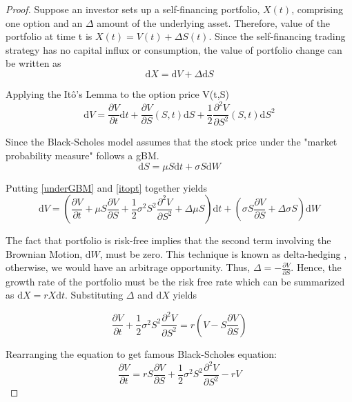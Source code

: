 \documentclass[12pt, oneside]{book}
\theoremstyle{plain}
\theoremstyle{definition}
\begin{document}
\begin{proof}
Suppose an investor sets up a self-financing portfolio,  $ X(t)$, comprising one option and an $\Delta$ amount of the underlying asset. Therefore, value of the portfolio at time t is $X(t) = V(t) + \Delta S(t)$. 
Since the self-financing trading strategy has no capital influx or consumption, the value of portfolio change can be written as 
\begin{equation}
\mathrm{d} X = \mathrm{d} V + \Delta \mathrm{d}S
\end{equation}

Applying the It\^{o}'s Lemma to the option price V(t,S)
\begin{equation}\label{itopt}
\mathrm{d}V = \frac{\partial V}{\partial t} \mathrm{d}t + \frac{\partial V}{\partial S} (S,t) \mathrm{d}S + \frac{1}{2}\frac{\partial^2 V}{\partial S^2}(S,t) \mathrm{d}S^2
\end{equation}

Since the Black-Scholes model assumes that the stock price under the "market probability measure" follows a gBM. 
\begin{equation}\label{underGBM}
\mathrm{d}S = \mu S \mathrm{d}t + \sigma S \mathrm{d}W
\end{equation}

Putting \ref{underGBM} and \ref{itopt} together yields
\begin{equation}
\mathrm{d}V = (\frac{\partial V}{\partial t} + \mu S \frac{\partial V}{\partial S} + \frac{1}{2} \sigma^2 S^2 \frac{\partial^2 V}{\partial S^2} + \Delta \mu S) \mathrm{d}t + (\sigma S \frac{\partial V}{\partial S}+\Delta \sigma S) \mathrm{d}W
\end{equation}

The fact that portfolio is risk-free implies that the second term involving the Brownian Motion, $\mathrm{d}W$, must be zero.  This technique is known as delta-hedging , otherwise, we would have an arbitrage opportunity. Thus, $ \Delta = - \frac{\partial V}{\partial S}$.  Hence, the growth rate of the portfolio must be the risk free rate which can be summarized as $ \mathrm{d}X = r X \mathrm{d}t $. Substituting $\Delta$ and $\mathrm{d}X$ yields

\begin{equation}
\frac{\partial V}{\partial t} + \frac{1}{2} \sigma^2 S^2 \frac{\partial^2 V}{\partial S^2} = r(V-S\frac{\partial V}{\partial S})
\end{equation}

Rearranging the equation to get famous Black-Scholes equation:
\begin{equation}
\frac{\partial V}{\partial t} = rS\frac{\partial V}{\partial S}+\frac{1}{2} \sigma^2 S^2 \frac{\partial^2 V}{\partial S^2} - rV
\end{equation}
\end{proof} 
\end{document}
